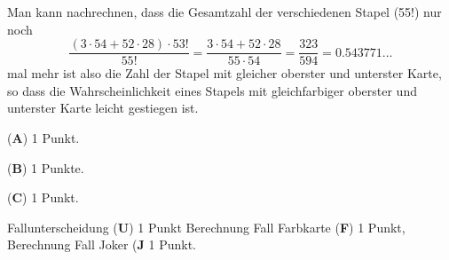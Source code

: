 \begin{diskussion}
Man kann nachrechnen, dass die Gesamtzahl der verschiedenen Stapel (55!)
nur noch
\[
\frac{ (3\cdot 54 + 52\cdot 28)\cdot 53!}{55!}
=
\frac{3\cdot 54+52\cdot 28}{55\cdot 54}
=
\frac{323}{594}
=
0.543771\dots
\]
mal mehr ist also die Zahl der Stapel mit gleicher
oberster und unterster Karte, so dass die Wahrscheinlichkeit eines
Stapels mit gleichfarbiger oberster und unterster Karte leicht
gestiegen ist.
\end{diskussion}

\begin{bewertung}
\begin{teilaufgaben}
\item ({\bf A}) 1 Punkt.
\item ({\bf B}) 1 Punkte.
\item ({\bf C}) 1 Punkt.
\item Fallunterscheidung ({\bf U}) 1 Punkt
Berechnung Fall Farbkarte ({\bf F}) 1 Punkt,
Berechnung Fall Joker ({\bf J} 1 Punkt.
\end{teilaufgaben}
\end{bewertung}
